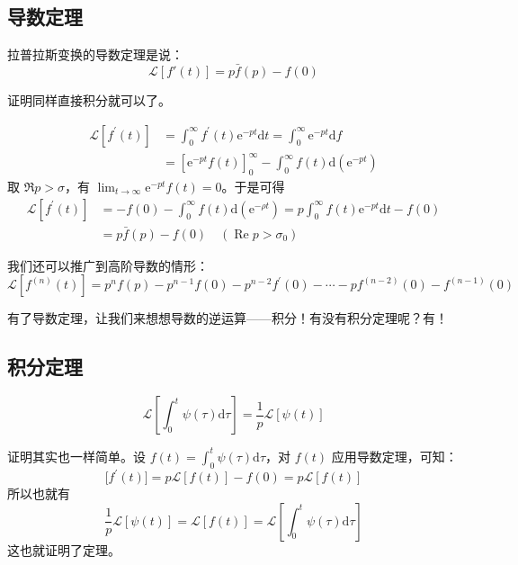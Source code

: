 \subsection{导数定理}

拉普拉斯变换的导数定理是说：
\begin{equation}
\mathscr L[f'(t)]=p\bar f(p)-f(0)
\end{equation}

证明同样直接积分就可以了。

\begin{equation}
\begin{aligned} \mathscr L[f^{\prime}(t)] & = \int_{0}^{\infty} f^{\prime}(t) \mathrm{e}^{-p t} \mathrm{d} t=\int_{0}^{\infty} \mathrm{e}^{-p t} \mathrm{d} f \\ &=\left[\mathrm{e}^{-p t} f(t)\right]_{0}^{\infty}-\int_{0}^{\infty} f(t) \mathrm{d}\left(\mathrm{e}^{-p t}\right) \end{aligned}
\end{equation}
取 $\Re p>\sigma$，有 $\lim_{t\to\infty}\mathrm{e}^{-pt}f(t)=0$。于是可得
\begin{equation}
\begin{aligned} \mathscr L[f^{\prime}(t)] & = -f(0)-\int_{0}^{\infty} f(t) \mathrm{d}\left(\mathrm{e}^{-\rho t}\right)=p \int_{0}^{\infty} f(t) \mathrm{e}^{-p t} \mathrm{d} t-f(0) \\ &=p \bar{f}(p)-f(0) \quad\left(\operatorname{Re} p>\sigma_{0}\right) \end{aligned}
\end{equation}

我们还可以推广到高阶导数的情形：
\begin{equation}
\mathscr L[f^{(n)}(t)] = p^{n} f(p)-p^{n-1} f(0)-p^{n-2} f^{\prime}(0)-\cdots-p f^{(n-2)}(0)-f^{(n-1)}(0)
\end{equation} 

有了导数定理，让我们来想想导数的逆运算——积分！有没有积分定理呢？有！

\subsection{积分定理}
\begin{equation}
\mathscr L\left[\int_{0}^{t} \psi(\tau) \mathrm{d} \tau \right]=\frac{1}{p} \mathscr{L}[\psi(t)]
\end{equation}

证明其实也一样简单。设 $\displaystyle f(t)=\int_{0}^{t} \psi(\tau) \mathrm{d} \tau$，对 $f(t)$ 应用导数定理，可知：
\begin{equation}
\mathscr[f^{\prime}(t)]=p \mathscr{L}[f(t)]-f(0)=p \mathscr{L}[f(t)]
\end{equation}
所以也就有
\begin{equation}
\frac{1}{p} \mathscr{L}[\psi(t)]=\mathscr{L}[f(t)]=\mathscr{L}\left[\int_{0}^{t} \psi(\tau) \mathrm{d} \tau\right]
\end{equation}
这也就证明了定理。
 
